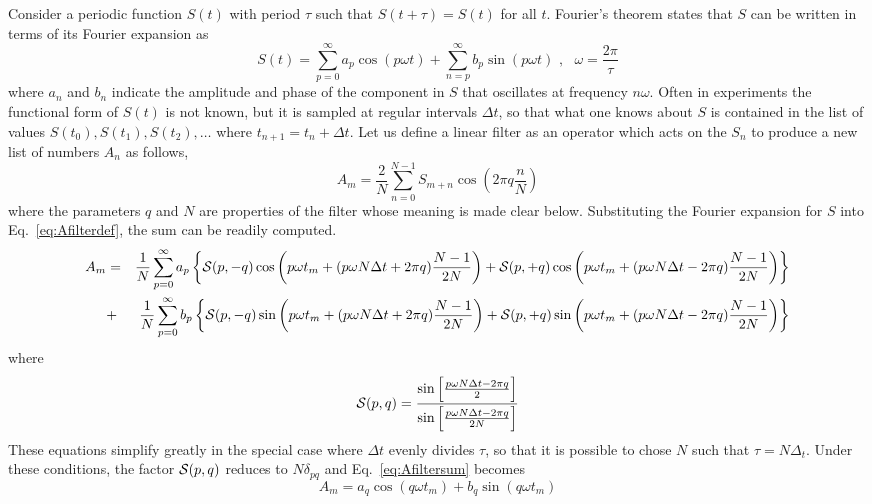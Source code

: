 \documentclass{revtex4}
\begin{document}
Consider a periodic function $S(t)$ with period $\tau$ such that
$S(t+\tau)=S(t)$ for all $t$.  Fourier's theorem states that $S$ can
be written in terms of its Fourier expansion as
\begin{equation}
S(t)=\sum_{p=0}^{\infty}{a_p \cos(p\omega t)}+
\sum_{n=p}^{\infty}{b_p \sin(p\omega t)}
\,\,,\,\,\,\,
\omega=\frac{2\pi}{\tau}
\label{eq:fourierex}
\end{equation}
where $a_n$ and $b_n$ indicate the amplitude and phase of the component
in $S$ that oscillates at frequency $n\omega$.  Often in experiments the
functional form of $S(t)$ is not known, but it is sampled at regular
intervals $\Delta t$, so that what one knows about $S$ is contained in the
list of values $S(t_0), S(t_1), S(t_2),\ldots$ where $t_{n+1}=t_n+\Delta t$.
Let us define a linear filter as an operator which acts on the $S_n$ to
produce a new list of numbers $A_n$ as follows,
\begin{equation}
A_m = \frac{2}{N}\sum_{n=0}^{N-1}{S_{m+n}\cos\left(2\pi q\frac{n}{N}\right)}
\label{eq:Afilterdef}
\end{equation}
where the parameters $q$ and $N$ are properties of the filter whose meaning
is made clear below.  Substituting the Fourier expansion for $S$ into
Eq.~\ref{eq:Afilterdef}, the sum can be readily computed.
\begin{eqnarray}
A_m&=&\frac{1}{N} 
\sum_{p=0}^{\infty}
a_p\left\{{\cal S}(p,-q)
\cos\left(p\omega t_m+(p\omega N\Delta t+2\pi q)\frac{N-1}{2N}\right)
+{\cal S}(p,+q)
\cos\left(p\omega t_m+(p\omega N\Delta t-2\pi q)\frac{N-1}{2N}\right)
\right\}\nonumber\\
&+&\frac{1}{N} 
\sum_{p=0}^{\infty}
b_p\left\{{\cal S}(p,-q)
\sin\left(p\omega t_m+(p\omega N\Delta t+2\pi q)\frac{N-1}{2N}\right)
+{\cal S}(p,+q)
\sin\left(p\omega t_m+(p\omega N\Delta t-2\pi q)\frac{N-1}{2N}\right)
\right\}\nonumber\\
\label{eq:Afiltersum}
\end{eqnarray}
where
\begin{equation}
{\cal S}(p,q)=
\frac{\sin\left[\frac{p\omega N\Delta t-2\pi q}{2}\right]}
{\sin\left[\frac{p\omega N\Delta t-2\pi q}{2N}\right]}
\end{equation}
These equations simplify greatly in the special case where $\Delta t$
evenly divides $\tau$, so that it is possible to chose $N$ such that
$\tau=N\Delta_t$.  Under these conditions, the factor ${\cal S}(p,q)$
reduces to $N\delta_{pq}$ and Eq.~\ref{eq:Afiltersum} becomes
\begin{equation}
A_m=a_q\cos(q\omega t_m)+b_q\sin(q\omega t_m)
\end{equation}
\end{document}
